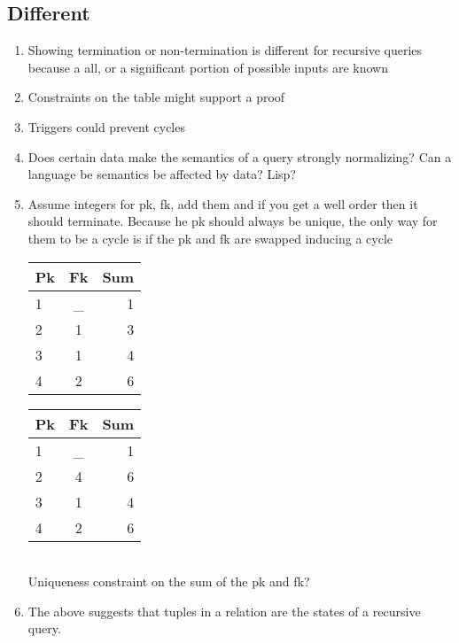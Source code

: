 \documentclass[12pt]{article}
\begin{document}
\subsection{Different}
\begin{enumerate}
  \item Showing termination or non-termination is different for recursive queries because a all, or a significant portion of possible inputs are known
  \item Constraints on the table might support a proof
  \item Triggers could prevent cycles
  \item Does certain data make the semantics of a query strongly normalizing? Can a language be semantics be affected by data? Lisp?
  \item Assume integers for pk, fk, add them and if you get a well order then it should
    terminate. Because he pk should always be unique, the only way for them to be
    a cycle is if the pk and fk are swapped inducing a cycle \\

    \begin{tabular}{| l | c || r |}
      \hline
      Pk & Fk & Sum \\
      \hline
      1 & _ & 1 \\
      2 & 1 & 3 \\
      3 & 1 & 4 \\
      4 & 2 & 6 \\
      \hline
    \end{tabular}

    \begin{tabular}{| l | c || r |}
      \hline
      Pk & Fk & Sum \\
      \hline
      1 & _ & 1 \\
      2 & 4 & 6 \\
      3 & 1 & 4 \\
      4 & 2 & 6 \\
      \hline
    \end{tabular} \\

    Uniqueness constraint on the sum of the pk and fk?
  \item The above suggests that tuples in a relation are the states of a recursive query.

\end{enumerate}
\end{document}
